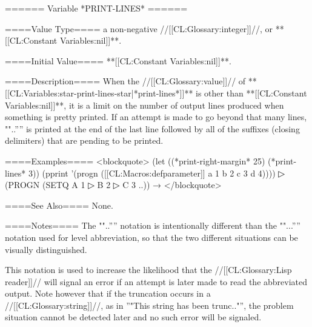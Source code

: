 ====== Variable *PRINT-LINES* ======

====Value Type====
a non-negative //[[CL:Glossary:integer]]//, or **[[CL:Constant Variables:nil]]**.

====Initial Value====
**[[CL:Constant Variables:nil]]**.

====Description====
When the //[[CL:Glossary:value]]// of **[[CL:Variables:star-print-lines-star|*print-lines*]]** is other than **[[CL:Constant Variables:nil]]**, it is a limit on the number of output lines produced when something is pretty printed. If an attempt is made to go beyond that many lines, ""..'''' is printed at the end of the last line followed by all of the suffixes (closing delimiters) that are pending to be printed.

====Examples====
<blockquote> (let ((*print-right-margin* 25) (*print-lines* 3)) (pprint '(progn ([[CL:Macros:defparameter]] a 1 b 2 c 3 d 4))))
▷ (PROGN (SETQ A 1
▷ B 2
▷ C 3 ..)) → \novalues </blockquote>

====See Also====
None.

====Notes====
The ""..'''' notation is intentionally different than the ""...'''' notation used for level abbreviation, so that the two different situations can be visually distinguished.

This notation is used to increase the likelihood that the //[[CL:Glossary:Lisp reader]]// will signal an error if an attempt is later made to read the abbreviated output. Note however that if the truncation occurs in a //[[CL:Glossary:string]]//, as in ''"This string has been trunc.."'', the problem situation cannot be detected later and no such error will be signaled.

